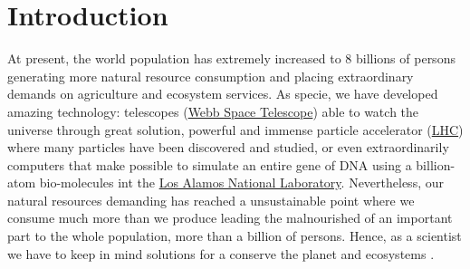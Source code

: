 \chapter{Introduction}\label{chap_Introduction}

At present, the world population has extremely increased to 8 billions of persons generating more natural resource consumption and placing extraordinary demands on agriculture and ecosystem services. As specie, we have developed amazing technology: telescopes (\href{https://webbtelescope.org/news/first-images/gallery}{Webb Space Telescope}) able to watch the universe through great solution, powerful and immense particle accelerator (\href{https://www.google.com/search?q=lhc&rlz=1C1ALOY_esCO977CO977&oq=LHC&aqs=chrome.0.0i67j46i199i465i512j0i512l8.3040j0j7&sourceid=chrome&ie=UTF-8}{LHC}) where many particles have been discovered and studied, or even extraordinarily computers that make possible to simulate an entire gene of DNA using a billion-atom bio-molecules int the \href{https://www.lanl.gov/org/ddste/aldsc/index.php}{Los Alamos National Laboratory}. Nevertheless, our natural resources demanding has reached a unsustainable point where we consume much more than we produce leading the malnourished of an important part to the whole population, more than a billion of persons. Hence, as a scientist we have to keep in mind solutions for a conserve the planet and ecosystems \cite{Foley2011}.

